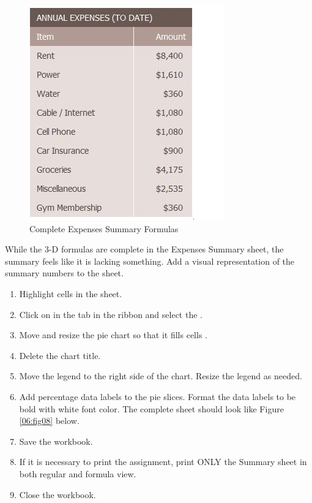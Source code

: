 \begin{figure}[H]
	\centering
	\includegraphics[width=\maxwidth{.95\linewidth}]{gfx/ch06_fig07}
	\caption{Complete Expenses Summary Formulas}
	\label{06:fig07}
\end{figure}

While the 3-D formulas are complete in the Expenses Summary sheet, the summary feels like it is lacking something. Add a visual representation of the summary numbers to the sheet.

\begin{enumerate}
	\item Highlight cells  in the  sheet.
	\item Click on  in the  tab in the ribbon and select the .
	\item Move and resize the pie chart so that it fills cells .
	\item Delete the chart title.
	\item Move the legend to the right side of the chart. Resize the legend as needed.
	\item Add percentage data labels to the pie slices. Format the data labels to be bold with white font color. The complete  sheet should look like Figure \ref{06:fig08} below.
	\item Save the workbook. 
	\item If it is necessary to print the assignment, print ONLY the Summary sheet in both regular and formula view. 
	\item Close the workbook.
\end{enumerate}

